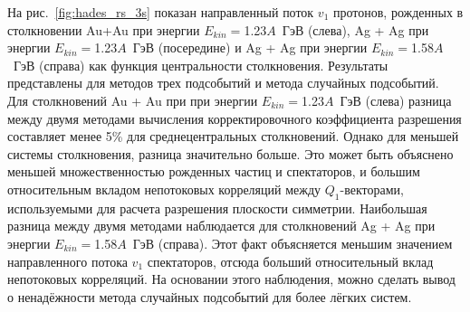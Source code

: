На рис.~\ref{fig:hades_rs_3s} показан направленный поток $v_1$ протонов, рожденных в столкновении Au+Au при энергии $E_{kin}=$1.23$A$~ГэВ (слева), Ag + Ag при энергии $E_{kin}=$1.23$A$~ГэВ (посередине) и Ag + Ag при энергии $E_{kin}=$1.58$A$~ГэВ (справа) как функция центральности столкновения. Результаты представлены для методов трех подсобытий и метода случайных подсобытий.
Для столкновений Au + Au при при энергии $E_{kin}=$1.23$A$~ГэВ (слева) разница между двумя методами вычисления корректировочного коэффициента разрешения составляет менее 5\% для среднецентральных столкновений.
Однако для меньшей системы столкновения, разница значительно больше. 
Это может быть объяснено меньшей множественностью рожденных частиц и спектаторов, и большим относительным вкладом непотоковых корреляций между $Q_1$-векторами, используемыми для расчета разрешения плоскости симметрии.
Наибольшая разница между двумя методами наблюдается для столкновений Ag + Ag при энергии $E_{kin}=$1.58$A$~ГэВ (справа).
Этот факт объясняется меньшим значением направленного потока $v_1$ спектаторов, отсюда больший относительный вклад непотоковых корреляций.
На основании этого наблюдения, можно сделать вывод о ненадёжности метода случайных подсобытий для более лёгких систем.
%
